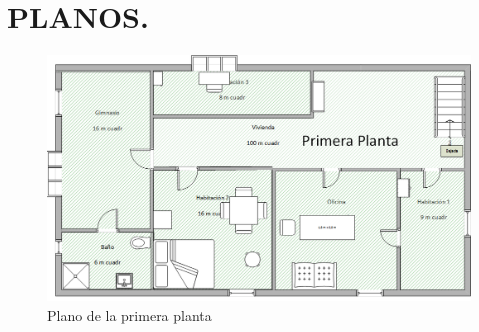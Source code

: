 \chapter{PLANOS.}
\begin{landscape}
	\begin{figure}[H]
		\centering
		\includegraphics[scale=0.90]{../img/PlanoVivienda.png}
		\caption{Plano de la primera planta}
	\end{figure}
\end{landscape}

